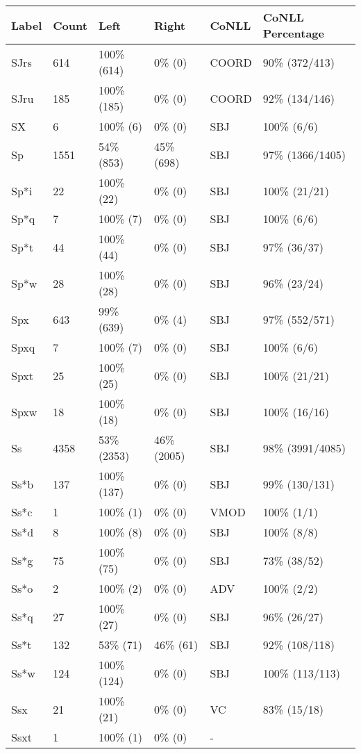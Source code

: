 \begin{figure*}
\begin{tabular}{|l|l|l|l||l|l|}
\hline
Label & Count & Left & Right & CoNLL & CoNLL Percentage\\ 
\hline
 SJrs & 614 & 100\% (614) & 0\% (0) & COORD & 90\% (372/413) \\ 
\hline
 SJru & 185 & 100\% (185) & 0\% (0) & COORD & 92\% (134/146) \\ 
\hline
 SX & 6 & 100\% (6) & 0\% (0) & SBJ & 100\% (6/6) \\ 
\hline
 Sp & 1551 & 54\% (853) & 45\% (698) & SBJ & 97\% (1366/1405) \\ 
\hline
 Sp*i & 22 & 100\% (22) & 0\% (0) & SBJ & 100\% (21/21) \\ 
\hline
 Sp*q & 7 & 100\% (7) & 0\% (0) & SBJ & 100\% (6/6) \\ 
\hline
 Sp*t & 44 & 100\% (44) & 0\% (0) & SBJ & 97\% (36/37) \\ 
\hline
 Sp*w & 28 & 100\% (28) & 0\% (0) & SBJ & 96\% (23/24) \\ 
\hline
 Spx & 643 & 99\% (639) & 0\% (4) & SBJ & 97\% (552/571) \\ 
\hline
 Spxq & 7 & 100\% (7) & 0\% (0) & SBJ & 100\% (6/6) \\ 
\hline
 Spxt & 25 & 100\% (25) & 0\% (0) & SBJ & 100\% (21/21) \\ 
\hline
 Spxw & 18 & 100\% (18) & 0\% (0) & SBJ & 100\% (16/16) \\ 
\hline
 Ss & 4358 & 53\% (2353) & 46\% (2005) & SBJ & 98\% (3991/4085) \\ 
\hline
 Ss*b & 137 & 100\% (137) & 0\% (0) & SBJ & 99\% (130/131) \\ 
\hline
 Ss*c & 1 & 100\% (1) & 0\% (0) & VMOD & 100\% (1/1) \\ 
\hline
 Ss*d & 8 & 100\% (8) & 0\% (0) & SBJ & 100\% (8/8) \\ 
\hline
 Ss*g & 75 & 100\% (75) & 0\% (0) & SBJ & 73\% (38/52) \\ 
\hline
 Ss*o & 2 & 100\% (2) & 0\% (0) & ADV & 100\% (2/2) \\ 
\hline
 Ss*q & 27 & 100\% (27) & 0\% (0) & SBJ & 96\% (26/27) \\ 
\hline
 Ss*t & 132 & 53\% (71) & 46\% (61) & SBJ & 92\% (108/118) \\ 
\hline
 Ss*w & 124 & 100\% (124) & 0\% (0) & SBJ & 100\% (113/113) \\ 
\hline
 Ssx & 21 & 100\% (21) & 0\% (0) & VC & 83\% (15/18) \\ 
\hline
 Ssxt & 1 & 100\% (1) & 0\% (0) & - &  \\ 

\end{tabular}
\end{figure*}

